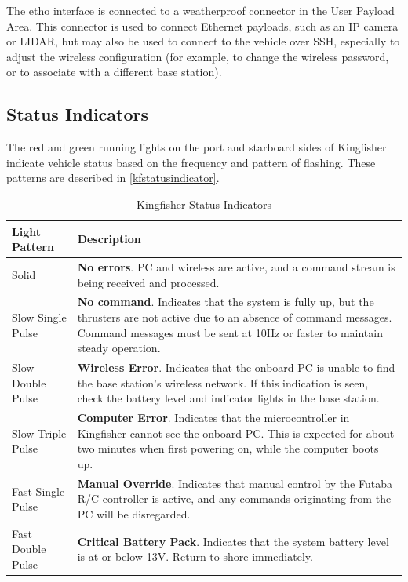 \documentclass[]{clearpath-latex/clearpath-manual}
\begin{document}
The etho interface is connected to a weatherproof connector in the User Payload Area. This connector is used to connect Ethernet payloads, such as an IP camera or LIDAR, but may also be used to connect to the vehicle over SSH, especially to adjust the wireless configuration (for example, to change the wireless password, or to associate with a different base station).
\newpage
\subsection{Status Indicators} \label{statusindicators}
The red and green running lights on the port and starboard sides of Kingfisher indicate vehicle status based on the frequency and pattern of flashing. These patterns are described in \autoref{kfstatusindicator}.

\bgroup
\def\arraystretch{1.5}%
\begin{table}[h]
\centering
\begin{tabular}{m{} p{}}
\rowcolor{lightgrey} 
Light Pattern     & Description                                                                                                                                                                                              \\ \hline
Solid             & \textbf{No errors}. PC and wireless are active, and a command stream is being received and processed.                                                                                                             \\ \hline
Slow Single Pulse & \textbf{No command}. Indicates that the system is fully up, but the thrusters are not active due to an absence of command messages. Command messages must be sent at 10Hz or faster to maintain steady operation. \\ \hline
Slow Double Pulse & \textbf{Wireless Error}. Indicates that the onboard PC is unable to find the base station’s wireless network. If this indication is seen, check the battery level and indicator lights in the base station.       \\ \hline
Slow Triple Pulse & \textbf{Computer Error}. Indicates that the microcontroller in Kingfisher cannot see the onboard PC. This is expected for about two minutes when first powering on, while the computer boots up.                  \\ \hline
Fast Single Pulse & \textbf{Manual Override}. Indicates that manual control by the Futaba R/C controller is active, and any commands originating from the PC will be disregarded.                                                     \\ \hline
Fast Double Pulse & \textbf{Critical Battery Pack}. Indicates that the system battery level is at or below 13V. Return to shore immediately. \\ \hline                                                                                      
\end{tabular}
\newline
\caption{Kingfisher Status Indicators} 
\label{kfstatusindicator} 
\end{table}
\egroup
\end{document}
